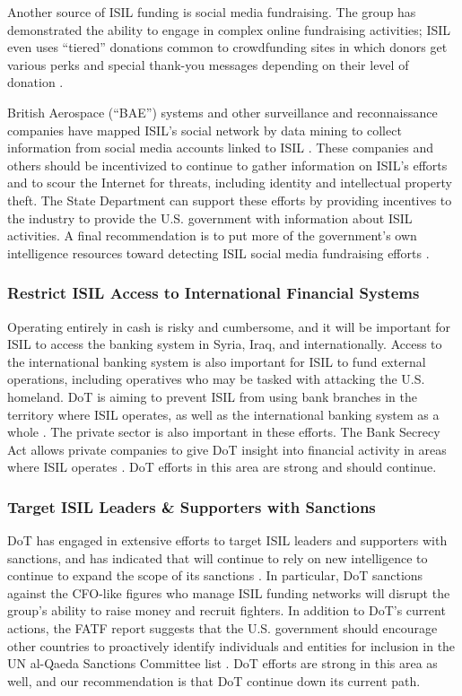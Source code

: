 \documentclass{report}
\begin{document}
Another source of ISIL funding is social media fundraising. The group has demonstrated the ability to engage in complex online fundraising activities; ISIL even uses \enquote{tiered} donations common to crowdfunding sites in which donors get various perks and special thank-you messages depending on their level of donation \cite{Report2015}. 


British Aerospace (\enquote{BAE}) systems and other surveillance and reconnaissance companies have mapped ISIL's social network by data mining to collect information from social media accounts linked to ISIL \cite{Tadjdeh2014}. These companies and others should be incentivized to continue to gather information on ISIL's efforts and to scour the Internet for threats, including identity and intellectual property theft. The State Department can support these efforts by providing incentives to the industry to provide the U.S. government with information about ISIL activities. A final recommendation is to put more of the government's own intelligence resources toward detecting ISIL social media fundraising efforts \cite{Report2015}.

\subsubsection{Restrict ISIL Access to International Financial Systems}

Operating entirely in cash is risky and cumbersome, and it will be important for ISIL to access the banking system in Syria, Iraq, and internationally. Access to the international banking system is also important for ISIL to fund external operations, including operatives who may be tasked with attacking the U.S. homeland. DoT is aiming to prevent ISIL from using bank branches in the territory where ISIL operates, as well as the international banking system as a whole \cite{Cohen2014}. The private sector is also important in these efforts. The Bank Secrecy Act allows private companies to give DoT insight into financial activity in areas where ISIL operates \cite{Cohen2014}. DoT efforts in this area are strong and should continue.

\subsubsection{Target ISIL Leaders \& Supporters with Sanctions}

DoT has engaged in extensive efforts to target ISIL leaders and supporters with sanctions, and has indicated that will continue to rely on new intelligence to continue to expand the scope of its sanctions \cite{Cohen2014}. In particular, DoT sanctions against the CFO-like figures who manage ISIL funding networks will disrupt the group's ability to raise money and recruit fighters. In addition to DoT's current actions, the FATF report suggests that the U.S. government should encourage other countries to proactively identify individuals and entities for inclusion in the UN al-Qaeda Sanctions Committee list \cite{Report2015}. DoT efforts are strong in this area as well, and our recommendation is that DoT continue down its current path.
\end{document}
